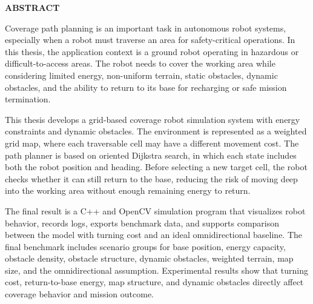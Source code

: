 \documentclass[../DoAn.tex]{subfiles}
\begin{document}
\begin{center}
    \Large{\textbf{ABSTRACT}}\\
\end{center}
\vspace{1cm}

Coverage path planning is an important task in autonomous robot systems, especially when a robot must traverse an area for safety-critical operations. In this thesis, the application context is a ground robot operating in hazardous or difficult-to-access areas. The robot needs to cover the working area while considering limited energy, non-uniform terrain, static obstacles, dynamic obstacles, and the ability to return to its base for recharging or safe mission termination.

This thesis develops a grid-based coverage robot simulation system with energy constraints and dynamic obstacles. The environment is represented as a weighted grid map, where each traversable cell may have a different movement cost. The path planner is based on oriented Dijkstra search, in which each state includes both the robot position and heading. Before selecting a new target cell, the robot checks whether it can still return to the base, reducing the risk of moving deep into the working area without enough remaining energy to return.

The final result is a C++ and OpenCV simulation program that visualizes robot behavior, records logs, exports benchmark data, and supports comparison between the model with turning cost and an ideal omnidirectional baseline. The final benchmark includes scenario groups for base position, energy capacity, obstacle density, obstacle structure, dynamic obstacles, weighted terrain, map size, and the omnidirectional assumption. Experimental results show that turning cost, return-to-base energy, map structure, and dynamic obstacles directly affect coverage behavior and mission outcome.
\end{document}
